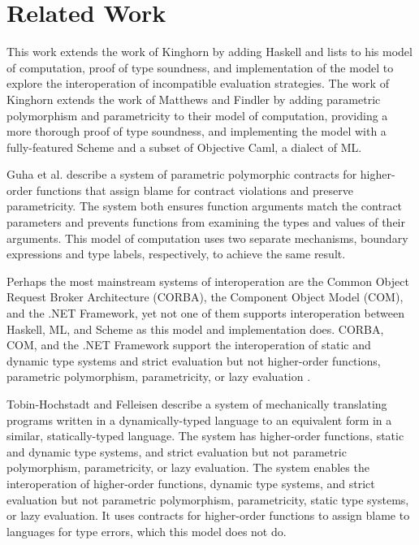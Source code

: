 \chapter{Related Work}

This work extends the work of Kinghorn \cite{kinghorn07} by adding Haskell and lists to his model of computation, proof of type soundness, and implementation of the model to explore the interoperation of incompatible evaluation strategies.  The work of Kinghorn extends the work of Matthews and Findler \cite{matthews07} by adding parametric polymorphism and parametricity to their model of computation, providing a more thorough proof of type soundness, and implementing the model with a fully-featured Scheme and a subset of Objective Caml, a dialect of ML.

Guha et al. \cite{guha07} describe a system of parametric polymorphic contracts for higher-order functions that assign blame for contract violations and preserve parametricity.  The system both ensures function arguments match the contract parameters and prevents functions from examining the types and values of their arguments. This model of computation uses two separate mechanisms, boundary expressions and type labels, respectively, to achieve the same result.

Perhaps the most mainstream systems of interoperation are the Common Object Request Broker Architecture (CORBA), the Component Object Model (COM), and the .NET Framework, yet not one of them supports interoperation between Haskell, ML, and Scheme as this model and implementation does.  CORBA, COM, and the .NET Framework support the interoperation of static and dynamic type systems and strict evaluation but not higher-order functions, parametric polymorphism, parametricity, or lazy evaluation \cite{omg04} \cite{microsoft07} \cite{ecma06}.

Tobin-Hochstadt and Felleisen \cite{tobin-hochstadt06} describe a system of mechanically translating programs written in a dynamically-typed language to an equivalent form in a similar, statically-typed language.  The system has higher-order functions, static and dynamic type systems, and strict evaluation but not parametric polymorphism, parametricity, or lazy evaluation.  The system enables the interoperation of higher-order functions, dynamic type systems, and strict evaluation but not parametric polymorphism, parametricity, static type systems, or lazy evaluation.  It uses contracts for higher-order functions to assign blame to languages for type errors, which this model does not do.

